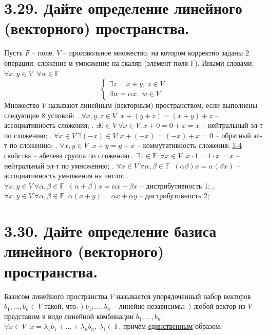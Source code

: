 \documentclass{article}
\begin{document}
\section*{\LARGE 3.29. Дайте определение линейного (векторного) пространства. }
Пусть $F$ -- поле, $V$ -- произвольное множество, на котором корректно заданы 2 операции: сложение и умножение на скаляр (элемент поля $\mathbb{F}$). Иными словами, $\forall x, y \in V \;\; \forall \alpha \in \mathbb{F}$
$$
\begin{cases}
\exists z = x + y, \; z \in V \\
\exists w = \alpha x, \; w \in V
\end{cases}
$$
Множество $V$ называют линейным (векторным) пространством, если выполнены следующие 8 условий:
\newline{}. $\forall x,y,z \in V \;\; x + (y + z) = (x + y) + z$ -- ассоциативность сложения;
\newline{}. $\exists 0 \in V\: \forall x \in V : x + 0 = 0 + x = x$ -- нейтральный эл-т по сложению;
\newline{}. $\forall x \in V \: \exists (-x) \in V : x + (-x) = (-x) + x = 0$ -- обратный эл-т по сложению;
\newline{}. $\forall x, y \in V \;\; x + y = y + x$ -- коммутативность сложения;
\newline \underline{1-4 свойства -- абелева группа по сложению}
\newline{}. $\exists 1 \in \mathbb{F} : \forall x \in V \;\; x \cdot 1 = 1 \cdot x = x$ -- нейтральный эл-т по умножению;
\newline{}. $\forall x \in V \: \forall \alpha, \beta \in \mathbb{F} \;\; (\alpha\beta)x = \alpha(\beta x)$ -- ассоциативность умножения на число;
\newline{}. $\forall x, y \in V \: \forall \alpha, \beta \in \mathbb{F} \;\;(\alpha + \beta)x = \alpha x + \beta x$ -- дистрибутивность 1;
\newline{}. $\forall x, y \in V \: \forall \alpha, \beta \in \mathbb{F} \;\;\alpha(x + y) = \alpha x + \alpha y$ -- дистрибутивность 2;

\section*{\LARGE 3.30. Дайте определение базиса линейного (векторного) пространства. }
Базисом линейного пространства $V$ называется упорядоченный набор векторов $b_1, ..., b_n \in V$ такой, что:
\newline {}) $b_1, ..., b_n$ -- линейно независимы;
\newline {}) любой вектор из $V$ представим в виде линейной комбинации $b_1, ..., b_n$:
\newline\indent $\forall x \in V \;\; x = \lambda_1b_1 + ... + \lambda_nb_n,\: \lambda_i \in \mathbb{F}$, причём \underline{единственным} образом;
\end{document}
